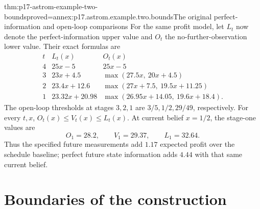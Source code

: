 \begin{hbtheorem}{thm:p17-astrom-example-two-bounds}{proved=annex:p17.astrom.example.two.bounds}{The original perfect-information and open-loop comparisons}
For the same profit model, let \(L_t\) now denote the
perfect-information upper value and \(O_t\) the no-further-observation
lower value. Their exact formulas are
\[
 \begin{array}{c|c|c}
 t&L_t(x)&O_t(x)\\ \hline
 4&25x-5&25x-5\\
 3&23x+4.5&\max(27.5x,\ 20x+4.5)\\
 2&23.4x+12.6&\max(27x+7.5,\ 19.5x+11.25)\\
 1&23.32x+20.98&\max(26.95x+14.05,\ 19.6x+18.4).
 \end{array}
\]
The open-loop thresholds at stages \(3,2,1\) are
\(3/5,1/2,29/49\), respectively.
For every \(t,x\), \(O_t(x)\leq V_t(x)\leq L_t(x)\).
At current belief \(x=1/2\), the stage-one values are
\[
                    O_1=28.2,\qquad V_1=29.37,\qquad L_1=32.64.
\]
Thus the specified future measurements add \(1.17\) expected
profit over the schedule baseline; perfect future state
information adds \(4.44\) with that same current belief.
\end{hbtheorem}

\section{Boundaries of the construction}

